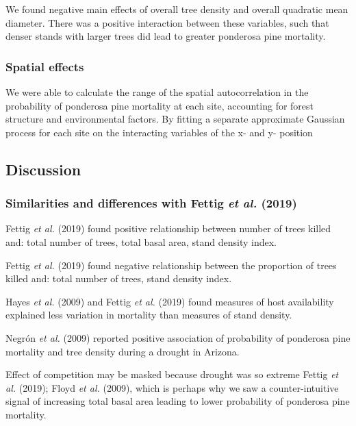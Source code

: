 \documentclass[]{article}
\begin{document}
We found negative main effects of overall tree density and overall
quadratic mean diameter. There was a positive interaction between these
variables, such that denser stands with larger trees did lead to greater
ponderosa pine mortality.

\subsubsection{Spatial effects}\label{spatial-effects}

We were able to calculate the range of the spatial autocorrelation in
the probability of ponderosa pine mortality at each site, accounting for
forest structure and environmental factors. By fitting a separate
approximate Gaussian process for each site on the interacting variables
of the x- and y- position

\subsection{Discussion}\label{discussion}

\subsubsection{\texorpdfstring{Similarities and differences with Fettig
\emph{et al.}
(2019)}{Similarities and differences with Fettig et al. (2019)}}\label{similarities-and-differences-with-fettig2019}

Fettig \emph{et al.} (2019) found positive relationship between number
of trees killed and: total number of trees, total basal area, stand
density index.

Fettig \emph{et al.} (2019) found negative relationship between the
proportion of trees killed and: total number of trees, stand density
index.

Hayes \emph{et al.} (2009) and Fettig \emph{et al.} (2019) found
measures of host availability explained less variation in mortality than
measures of stand density.

Negrón \emph{et al.} (2009) reported positive association of probability
of ponderosa pine mortality and tree density during a drought in
Arizona.

Effect of competition may be masked because drought was so extreme
Fettig \emph{et al.} (2019); Floyd \emph{et al.} (2009), which is
perhaps why we saw a counter-intuitive signal of increasing total basal
area leading to lower probability of ponderosa pine mortality.
\end{document}

